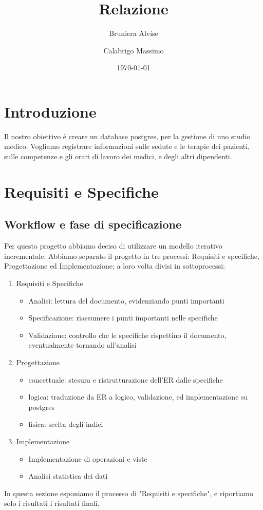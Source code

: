 \documentclass[11pt,a4paper]{article}
\title{Relazione}
\author{Bruniera Alvise\and Calabrigo Massimo}
\affil{Università degli studi di Udine}
\date{\today}
\begin{document}
\maketitle

\tableofcontents
\section{Introduzione}
Il nostro obiettivo è creare un database postgres, per la gestione di uno studio medico.
Vogliamo registrare informazioni sulle sedute e le terapie dei pazienti, sulle competenze e gli orari di lavoro dei medici, e degli altri dipendenti.
\section{Requisiti e Specifiche}

\subsection{Workflow e fase di specificazione}
Per questo progetto abbiamo deciso di utilizzare un modello iterativo incrementale.
Abbiamo separato il progetto in tre processi: Requisiti e specifiche, Progettazione ed Implementazione;
a loro volta divisi in sottoprocessi:
\begin{enumerate}
    \item Requisiti e Specifiche
    \begin{itemize}
        \item Analisi: lettura del documento, evidenziando punti importanti
        \item Specificazione: riassumere i punti importanti nelle specifiche
        \item Validazione: controllo che le specifiche rispettino il documento, eventualmente tornando all'analisi
    \end{itemize}
    \item Progettazione
    \begin{itemize}
        \item concettuale: stesura e ristrutturazione dell'ER dalle specifiche
        \item logica: traduzione da ER a logico, validazione, ed implementazione su postgres
        \item fisica: scelta degli indici
    \end{itemize}
    \item Implementazione
    \begin{itemize}
        \item Implementazione di operazioni e viste
        \item Analisi statistica dei dati
    \end{itemize}
\end{enumerate}
In questa sezione esponiamo il processo di "Requisiti e specifiche", e riportiamo
solo i risultati i risultati finali.
\end{document}
